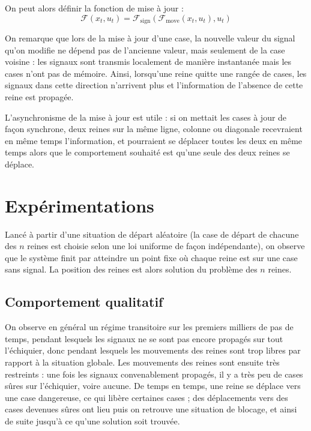 \documentclass[11pt, openany]{article}
\begin{document}
\bigskip

\noindent
On peut alors définir la fonction de mise à jour : $$\mathcal{F}(x_t, u_t) = \mathcal{F}_{\mathrm{sign}}(\mathcal{F}_{\mathrm{move}}(x_t, u_t), u_t)$$


On remarque que lors de la mise à jour d'une case, la nouvelle valeur du signal qu'on modifie ne dépend pas de l'ancienne valeur, mais seulement de la case voisine : les signaux sont transmis localement de manière instantanée mais les cases n'ont pas de mémoire. Ainsi, lorsqu'une reine quitte une rangée de cases, les signaux dans cette direction n'arrivent plus et l'information de l'absence de cette reine est propagée. 

L'asynchronisme de la mise à jour est utile : si on mettait les cases à jour de façon synchrone, deux reines sur la même ligne, colonne ou diagonale recevraient en même temps l'information, et pourraient se déplacer toutes les deux en même temps alors que le comportement souhaité est qu'une seule des deux reines se déplace. 






\clearpage




\section*{Expérimentations}


Lancé à partir d'une situation de départ aléatoire (la case de départ de chacune des $n$ reines est choisie selon une loi uniforme de façon indépendante), on observe que le système finit par atteindre un point fixe où chaque reine est sur une case sans signal. La position des reines est alors solution du problème des $n$ reines.

\subsection*{Comportement qualitatif}

On observe en général un régime transitoire sur les premiers milliers de pas de temps, pendant lesquels les signaux ne se sont pas encore propagés sur tout l'échiquier, donc pendant lesquels les mouvements des reines sont trop libres par rapport à la situation globale. Les mouvements des reines sont ensuite très restreints : une fois les signaux convenablement propagés, il y a très peu de cases sûres sur l'échiquier, voire aucune. De temps en temps, une reine se déplace vers une case dangereuse, ce qui libère certaines cases ; des déplacements vers des cases devenues sûres ont lieu puis on retrouve une situation de blocage, et ainsi de suite jusqu'à ce qu'une solution soit trouvée.
\end{document}

